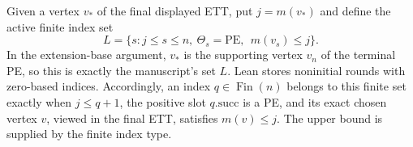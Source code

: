 \begin{definition}
Given a vertex \(v_*\) of the final displayed ETT, put \(j=m(v_*)\) and
define the active finite index set
\[
 L=\{s:j\leq s\leq n,\ \Theta_s=\mathrm{PE},\
                    \ m(v_s)\leq j\}.
\]
In the extension-base argument, \(v_*\) is the supporting vertex \(v_n\)
of the terminal PE, so this is exactly the manuscript's set \(L\).
Lean stores noninitial rounds with zero-based indices.  Accordingly, an
index \(q\in\operatorname{Fin}(n)\) belongs to this finite set exactly
when \(j\leq q+1\), the positive slot \(q.\mathrm{succ}\) is a PE, and
its exact chosen vertex \(v\), viewed in the final ETT, satisfies
\(m(v)\leq j\).  The upper bound is supplied by the finite index type.
\end{definition}
